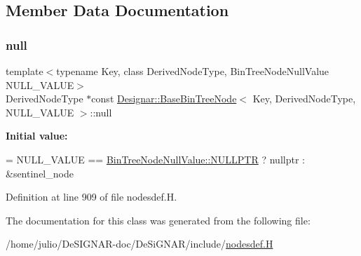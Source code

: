 \subsection{Member Data Documentation}
\mbox{\label{class_designar_1_1_base_bin_tree_node_a0ea0251169acae6e7943ccc54f66472a}} 
\subsubsection{\texorpdfstring{null}{null}}
{\footnotesize\ttfamily template$<$typename Key, class Derived\+Node\+Type, Bin\+Tree\+Node\+Null\+Value N\+U\+L\+L\+\_\+\+V\+A\+L\+UE$>$ \\
Derived\+Node\+Type $\ast$const \hyperlink{class_designar_1_1_base_bin_tree_node}{Designar\+::\+Base\+Bin\+Tree\+Node}$<$ Key, Derived\+Node\+Type, N\+U\+L\+L\+\_\+\+V\+A\+L\+UE $>$\+::null\hspace{0.3cm}{\ttfamily [static]}}

{\bfseries Initial value\+:}
\begin{DoxyCode}
=
    NULL\_VALUE == \hyperlink{namespace_designar_adc51778fc9415de368881abd254cca7cabf31abdbb1a298903e3a7f0edd0dcaf9}{BinTreeNodeNullValue::NULLPTR} ? nullptr : &sentinel\_node
\end{DoxyCode}


Definition at line 909 of file nodesdef.\+H.



The documentation for this class was generated from the following file\+:\begin{DoxyCompactItemize}
\item 
/home/julio/\+De\+S\+I\+G\+N\+A\+R-\/doc/\+De\+Si\+G\+N\+A\+R/include/\hyperlink{nodesdef_8_h}{nodesdef.\+H}\end{DoxyCompactItemize}
